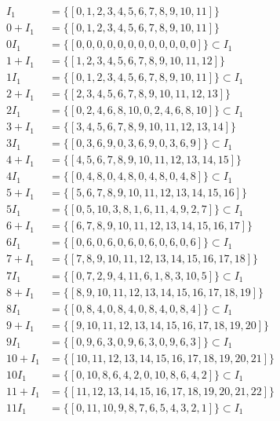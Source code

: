 \documentclass[11pt]{amsart}
\begin{document}
\begin{equation*}
\begin{aligned}
I_1 &= \{[0, 1, 2, 3, 4, 5, 6, 7, 8, 9, 10, 11]\} \\
0+ I_1 &= \{[0, 1, 2, 3, 4, 5, 6, 7, 8, 9, 10, 11]\}\\
0 I_1 &= \{[0, 0, 0, 0, 0, 0, 0, 0, 0, 0, 0, 0]\} \subset I_1 \\
1+ I_1 &= \{[1, 2, 3, 4, 5, 6, 7, 8, 9, 10, 11, 12]\}\\
1 I_1 &= \{[0, 1, 2, 3, 4, 5, 6, 7, 8, 9, 10, 11]\} \subset I_1 \\
2+ I_1 &= \{[2, 3, 4, 5, 6, 7, 8, 9, 10, 11, 12, 13]\}\\
2 I_1 &= \{[0, 2, 4, 6, 8, 10, 0, 2, 4, 6, 8, 10]\} \subset I_1 \\
3+ I_1 &= \{[3, 4, 5, 6, 7, 8, 9, 10, 11, 12, 13, 14]\}\\
3 I_1 &= \{[0, 3, 6, 9, 0, 3, 6, 9, 0, 3, 6, 9]\} \subset I_1 \\
4+ I_1 &= \{[4, 5, 6, 7, 8, 9, 10, 11, 12, 13, 14, 15]\}\\
4 I_1 &= \{[0, 4, 8, 0, 4, 8, 0, 4, 8, 0, 4, 8]\} \subset I_1 \\
5+ I_1 &= \{[5, 6, 7, 8, 9, 10, 11, 12, 13, 14, 15, 16]\}\\
5 I_1 &= \{[0, 5, 10, 3, 8, 1, 6, 11, 4, 9, 2, 7]\} \subset I_1 \\
6+ I_1 &= \{[6, 7, 8, 9, 10, 11, 12, 13, 14, 15, 16, 17]\}\\
6 I_1 &= \{[0, 6, 0, 6, 0, 6, 0, 6, 0, 6, 0, 6]\} \subset I_1 \\
7+ I_1 &= \{[7, 8, 9, 10, 11, 12, 13, 14, 15, 16, 17, 18]\}\\
7 I_1 &= \{[0, 7, 2, 9, 4, 11, 6, 1, 8, 3, 10, 5]\} \subset I_1 \\
8+ I_1 &= \{[8, 9, 10, 11, 12, 13, 14, 15, 16, 17, 18, 19]\}\\
8 I_1 &= \{[0, 8, 4, 0, 8, 4, 0, 8, 4, 0, 8, 4]\} \subset I_1 \\
9+ I_1 &= \{[9, 10, 11, 12, 13, 14, 15, 16, 17, 18, 19, 20]\}\\
9 I_1 &= \{[0, 9, 6, 3, 0, 9, 6, 3, 0, 9, 6, 3]\} \subset I_1 \\
10+ I_1 &= \{[10, 11, 12, 13, 14, 15, 16, 17, 18, 19, 20, 21]\}\\
10 I_1 &= \{[0, 10, 8, 6, 4, 2, 0, 10, 8, 6, 4, 2]\} \subset I_1 \\
11+ I_1 &= \{[11, 12, 13, 14, 15, 16, 17, 18, 19, 20, 21, 22]\}\\
11 I_1 &= \{[0, 11, 10, 9, 8, 7, 6, 5, 4, 3, 2, 1]\} \subset I_1 \\
\end{aligned}
\end{equation*}
\end{document}
